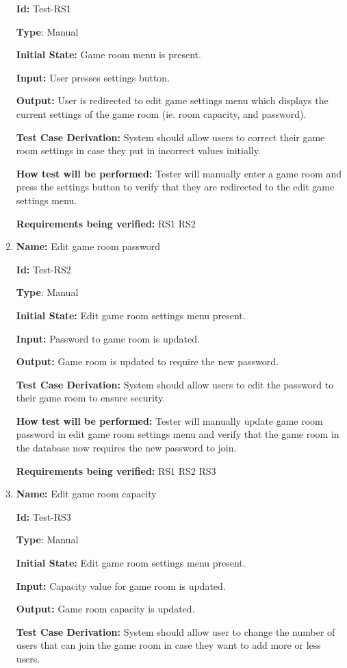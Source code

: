 \documentclass[12pt, titlepage]{article}
\begin{document}
\begin{enumerate}
\textbf{Id:} Test-RS1

\textbf{Type}: Manual

\textbf{Initial State:} Game room menu is present.

\textbf{Input:} User presses settings button.

\textbf{Output:} User is redirected to edit game settings menu which displays the current settings of the game room (ie. room capacity, and password).

\textbf{Test Case Derivation:} System should allow users to correct their game room settings in case they put in incorrect values initially.

\textbf{How test will be performed:} Tester will manually enter a game room and press the settings button to verify that they are redirected to the edit game settings menu.

\textbf{Requirements being verified: } RS1 RS2

\item{\textbf{Name:} Edit game room password}

\textbf{Id:} Test-RS2

\textbf{Type}: Manual

\textbf{Initial State:} Edit game room settings menu present.

\textbf{Input:} Password to game room is updated.

\textbf{Output:} Game room is updated to require the new password.

\textbf{Test Case Derivation:} System should allow users to edit the password to their game room to ensure security.

\textbf{How test will be performed:} Tester will manually update game room password in edit game room settings menu and verify that the game room in the database now requires the new password to join.

\textbf{Requirements being verified: } RS1 RS2 RS3

\item{\textbf{Name:} Edit game room capacity}

\textbf{Id:} Test-RS3

\textbf{Type}: Manual

\textbf{Initial State:} Edit game room settings menu present.

\textbf{Input:} Capacity value for game room is updated.

\textbf{Output:} Game room capacity is updated.

\textbf{Test Case Derivation:} System should allow user to change the number of users that can join the game room in case they want to add more or less users.


\end{enumerate}
\end{document}
